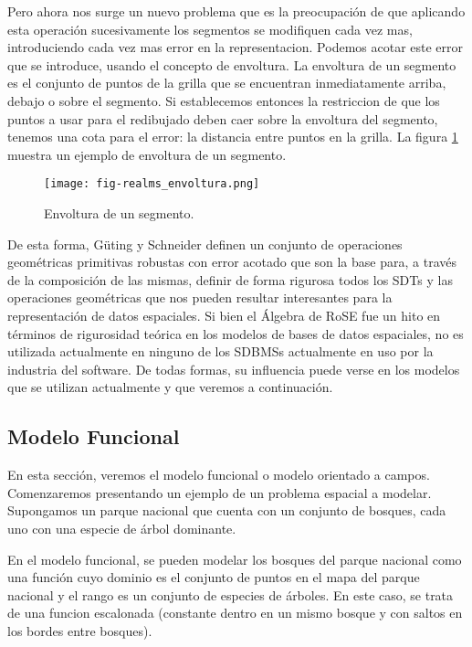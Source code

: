 Pero ahora nos surge un nuevo problema que es la preocupación de que aplicando esta operación sucesivamente
los segmentos se modifiquen cada vez mas, introduciendo cada vez mas error en la representacion.
Podemos acotar este error que se introduce, usando el concepto de envoltura.
La envoltura de un segmento es el conjunto de puntos de la grilla que se encuentran inmediatamente arriba, debajo o sobre el segmento.
Si establecemos entonces la restriccion de que los puntos a usar para el redibujado deben caer sobre la envoltura del segmento,
tenemos una cota para el error: la distancia entre puntos en la grilla.
La figura \ref{fig:realms:envoltura} muestra un ejemplo de envoltura de un segmento.

\begin{figure}
    \centering
    \texttt{[image: fig-realms\_envoltura.png]}
    \caption{Envoltura de un segmento.}
    \label{fig:realms:envoltura}
\end{figure}

De esta forma, Güting y Schneider definen un conjunto de operaciones geométricas primitivas robustas con error acotado que son la base para,
a través de la composición de las mismas, definir de forma rigurosa todos los SDTs
y las operaciones geométricas que nos pueden resultar interesantes para la representación de datos espaciales.
Si bien el Álgebra de RoSE fue un hito en términos de rigurosidad teórica en los modelos de bases de datos espaciales,
no es utilizada actualmente en ninguno de los SDBMSs actualmente en uso por la industria del software.
De todas formas, su influencia puede verse en los modelos que se utilizan actualmente y que veremos a continuación.

\subsection{Modelo Funcional} \label{sec:s:fun}

En esta sección, veremos el modelo funcional o modelo orientado a campos.
Comenzaremos presentando un ejemplo de un problema espacial a modelar. Supongamos un parque nacional que cuenta con
un conjunto de bosques, cada uno con una especie de árbol dominante.

En el modelo funcional, se pueden modelar los bosques del parque nacional como
una función cuyo dominio es el conjunto de puntos en el mapa del parque nacional y el rango es un conjunto de especies de árboles.
En este caso, se trata de una funcion escalonada (constante dentro en un mismo bosque y con saltos en los bordes entre bosques).


